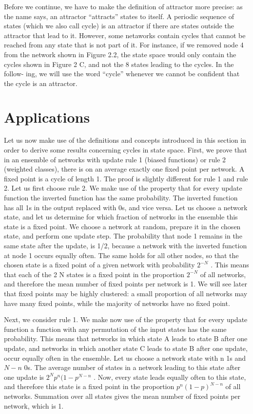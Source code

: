 Before we continue, we have to make the definition of
attractor more precise: as the name says, an attractor
“attracts” states to itself. A periodic sequence of states
(which we also call cycle) is an attractor if there are states
outside the attractor that lead to it. However, some netaworks contain cycles that cannot be reached from any
state that is not part of it. For instance, if we removed
node 4 from the network shown in Figure 2.2, the state
space would only contain the cycles shown in Figure 2 C,
and not the 8 states leading to the cycles. In the follow-
ing, we will use the word “cycle” whenever we cannot be
confident that the cycle is an attractor.


\section{Applications}

Let us now make use of the definitions and concepts
introduced in this section in order to derive some results
concerning cycles in state space. First, we prove that in
an ensemble of networks with update rule 1 (biased functions) or rule 2 (weighted classes), there is on an average
exactly one fixed point per network. A fixed point is a
cycle of length 1. The proof is slightly different for rule
1 and rule 2. Let us first choose rule 2. We make use of
the property that for every update function the inverted
function has the same probability. The inverted function
has all 1s in the output replaced with 0s, and vice versa.
Let us choose a network state, and let us determine for
which fraction of networks in the ensemble this state is a
fixed point. We choose a network at random, prepare it
in the chosen state, and perform one update step. The
probability that node 1 remains in the same state after
the update, is 1/2, because a network with the inverted
function at node 1 occurs equally often. The same holds
for all other nodes, so that the chosen state is a fixed
point of a given network with probability $2^{−N}$ . This
means that each of the 2 N states is a fixed point in the
proportion $2^{−N}$ of all networks, and therefore the mean
number of fixed points per network is 1. We will see
later that fixed points may be highly clustered: a small
proportion of all networks may have many fixed points,
while the majority of networks have no fixed point.


Next, we consider rule 1. We make now use of the
property that for every update function a function with
any permutation of the input states has the same probability. This means that networks in which state A leads
to state B after one update, and networks in which another state C leads to state B after one update, occur
equally often in the ensemble. Let us choose a network
state with n 1s and $N − n$ 0s. The average number of
states in a network leading to this state after one update
is $2^N p^n (1 − p^{N −n}$ . Now, every state leads equally often
to this state, and therefore this state is a fixed point in
the proportion $p^n (1 − p)^{N−n}$ of all networks. Summation
over all states gives the mean number of fixed points per
network, which is 1.

